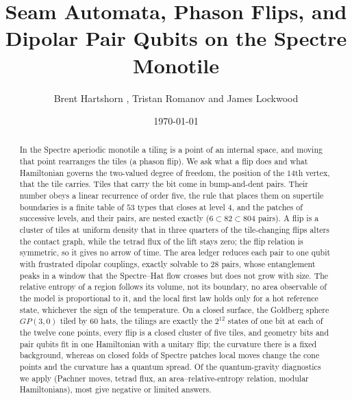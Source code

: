 \documentclass[11pt]{article}
\title{Seam Automata, Phason Flips, and Dipolar Pair Qubits on the Spectre Monotile}
\author{Brent Hartshorn \orcidlink{0009-0004-2853-655X}, Tristan Romanov and James Lockwood}
\date{\today}
\theoremstyle{definition}
\begin{document}
\maketitle

\begin{abstract}
\noindent In the Spectre aperiodic monotile a tiling is a point of an internal space, and moving that point rearranges the tiles (a phason flip). We ask what a flip does and what Hamiltonian governs the two-valued degree of freedom, the position of the $14$th vertex, that the tile carries. Tiles that carry the bit come in bump-and-dent pairs. Their number obeys a linear recurrence of order five, the rule that places them on supertile boundaries is a finite table of $53$ types that closes at level $4$, and the patches of successive levels, and their pairs, are nested exactly ($6\subset82\subset804$ pairs). A flip is a cluster of tiles at uniform density that in three quarters of the tile-changing flips alters the contact graph, while the tetrad flux of the lift stays zero; the flip relation is symmetric, so it gives no arrow of time. The area ledger reduces each pair to one qubit with frustrated dipolar couplings, exactly solvable to $28$ pairs, whose entanglement peaks in a window that the Spectre--Hat flow crosses but does not grow with size. The relative entropy of a region follows its volume, not its boundary, no area observable of the model is proportional to it, and the local first law holds only for a hot reference state, whichever the sign of the temperature. On a closed surface, the Goldberg sphere $GP(3,0)$ tiled by $60$ hats, the tilings are exactly the $2^{12}$ states of one bit at each of the twelve cone points, every flip is a closed cluster of five tiles, and geometry bits and pair qubits fit in one Hamiltonian with a unitary flip; the curvature there is a fixed background, whereas on closed folds of Spectre patches local moves change the cone points and the curvature has a quantum spread. Of the quantum-gravity diagnostics we apply (Pachner moves, tetrad flux, an area--relative-entropy relation, modular Hamiltonians), most give negative or limited answers.
\end{abstract}

\end{document}
